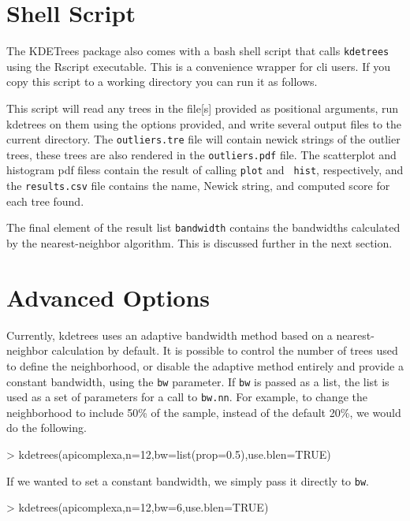 \documentclass{article}
\begin{document}
\section{Shell Script}
\label{sec:shell-script}

The KDETrees package also comes with a bash shell script that calls
{\tt kdetrees} using the Rscript executable. This is a convenience
wrapper for cli users. If you copy this script to a working directory
you can run it as follows.
This script will read any trees in the file[s] provided as positional
arguments, run kdetrees on them using the options provided, and write
several output files to the current directory. The {\tt outliers.tre}
file will contain newick strings of the outlier trees, these trees are
also rendered in the {\tt outliers.pdf} file. The scatterplot
and histogram pdf filess contain the result of calling {\tt plot} and {\tt
  hist}, respectively, and the {\tt results.csv} file contains the
name, Newick string, and computed score for each tree found.

The final element of the result list {\tt bandwidth} contains the
bandwidths calculated by the nearest-neighbor algorithm. This is
discussed further in the next section.

\section{Advanced Options}
\label{sec:advanced-options}
Currently, kdetrees uses an adaptive bandwidth method based on a
nearest-neighbor calculation by default. It is possible to control the
number of trees used to define the neighborhood, or disable the
adaptive method entirely and provide a constant bandwidth, using the
{\tt bw} parameter. If {\tt bw} is passed as a list, the list is used
as a set of parameters for a call to {\tt bw.nn}. For example, to
change the neighborhood to include 50\% of the sample, instead of the
default 20\%, we would do the following.
\begin{Schunk}
\begin{Sinput}
> kdetrees(apicomplexa,n=12,bw=list(prop=0.5),use.blen=TRUE)
\end{Sinput}
\end{Schunk}
If we wanted to set a constant bandwidth, we simply pass it directly
to {\tt bw}.
\begin{Schunk}
\begin{Sinput}
> kdetrees(apicomplexa,n=12,bw=6,use.blen=TRUE)
\end{Sinput}
\end{Schunk}
\end{document}
